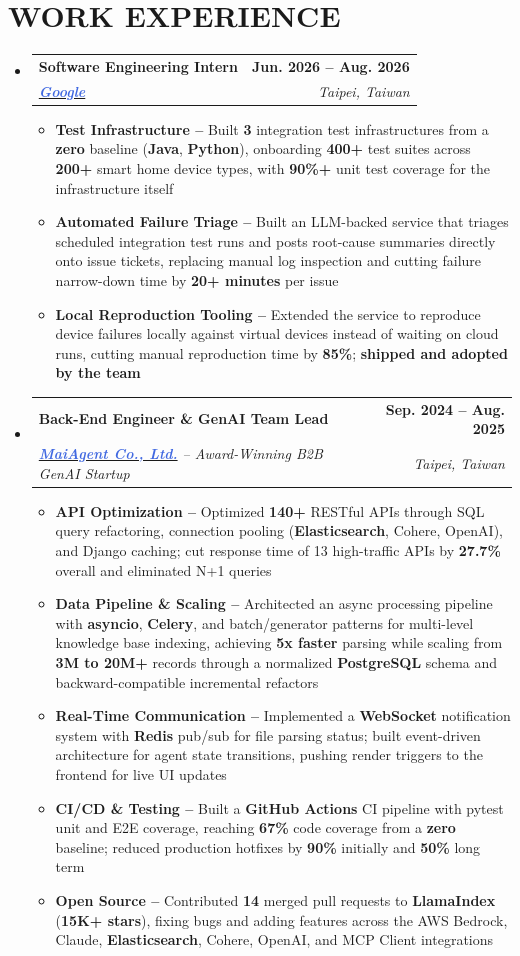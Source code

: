 \documentclass[letterpaper,11pt]{article}
\makeatletter
\newcommand{\resumeItem}[1]{\item\small{#1}}
\newcommand{\resumeEntry}[4]{
  \vspace{-3pt}\item
    \begin{tabular*}{1.0\textwidth}[t]{l@{\extracolsep{\fill}}r}
      \textbf{#1} & \textbf{\small #2} \\
      \textit{\small#3} & \textit{\small #4} \\
    \end{tabular*}
}
\newcommand{\resumeEntryListStart}{\begin{itemize}[leftmargin=0.0in, label={}]}
\newcommand{\resumeEntryListEnd}{\end{itemize}}
\newcommand{\resumeItemListStart}{\begin{itemize}[label=$\vcenter{\hbox{\tiny$\bullet$}}$]}
\newcommand{\resumeItemListEnd}{\end{itemize}}
\makeatother
\begin{document}
\section{WORK EXPERIENCE}
\vspace{2pt}
\resumeEntryListStart
  \resumeEntry
    {Software Engineering Intern}{Jun. 2026 -- Aug. 2026}
    {\href{https://about.google/}{\textcolor{RoyalBlue}{\textbf{Google}}}}{Taipei, Taiwan}
    \vspace{-6pt}
    \resumeItemListStart
      \resumeItem{\textbf{Test Infrastructure --} Built \textbf{3} integration test infrastructures from a \textbf{zero} baseline (\textbf{Java}, \textbf{Python}), onboarding \textbf{400+} test suites across \textbf{200+} smart home device types, with \textbf{90\%+} unit test coverage for the infrastructure itself}
      \resumeItem{\textbf{Automated Failure Triage --} Built an LLM-backed service that triages scheduled integration test runs and posts root-cause summaries directly onto issue tickets, replacing manual log inspection and cutting failure narrow-down time by \textbf{20+ minutes} per issue}
      \resumeItem{\textbf{Local Reproduction Tooling --} Extended the service to reproduce device failures locally against virtual devices instead of waiting on cloud runs, cutting manual reproduction time by \textbf{85\%}; \textbf{shipped and adopted by the team}}
    \resumeItemListEnd
  \resumeEntry
    {Back-End Engineer \& GenAI Team Lead}{Sep. 2024 -- Aug. 2025}
    {\href{https://docs.maiagent.ai/maiagent-user-guide/maiagent-user-guide-en/}{\textcolor{RoyalBlue}{\textbf{MaiAgent Co., Ltd.}}} -- Award-Winning B2B GenAI Startup}{Taipei, Taiwan}
    \vspace{-6pt}
    \resumeItemListStart
      \resumeItem{\textbf{API Optimization --} Optimized \textbf{140+} RESTful APIs through SQL query refactoring, connection pooling (\textbf{Elasticsearch}, Cohere, OpenAI), and Django caching; cut response time of 13 high-traffic APIs by \textbf{27.7\%} overall and eliminated N+1 queries}
      \resumeItem{\textbf{Data Pipeline \& Scaling --} Architected an async processing pipeline with \textbf{asyncio}, \textbf{Celery}, and batch/generator patterns for multi-level knowledge base indexing, achieving \textbf{5x faster} parsing while scaling from \textbf{3M to 20M+} records through a normalized \textbf{PostgreSQL} schema and backward-compatible incremental refactors}
      \resumeItem{\textbf{Real-Time Communication --} Implemented a \textbf{WebSocket} notification system with \textbf{Redis} pub/sub for file parsing status; built event-driven architecture for agent state transitions, pushing render triggers to the frontend for live UI updates}
      \resumeItem{\textbf{CI/CD \& Testing --} Built a \textbf{GitHub Actions} CI pipeline with pytest unit and E2E coverage, reaching \textbf{67\%} code coverage from a \textbf{zero} baseline; reduced production hotfixes by \textbf{90\%} initially and \textbf{50\%} long term}
      \resumeItem{\textbf{Open Source --} Contributed \textbf{14} merged pull requests to \textbf{LlamaIndex} (\textbf{15K+ stars}), fixing bugs and adding features across the AWS Bedrock, Claude, \textbf{Elasticsearch}, Cohere, OpenAI, and MCP Client integrations}
    \resumeItemListEnd
\resumeEntryListEnd
\end{document}
